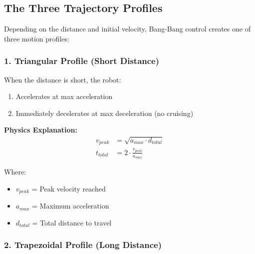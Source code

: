 \documentclass[12pt,a4paper]{article}
\begin{document}
\subsection{The Three Trajectory Profiles}

Depending on the distance and initial velocity, Bang-Bang control creates one of three motion profiles:

\subsubsection{1. Triangular Profile (Short Distance)}

When the distance is short, the robot:
\begin{enumerate}
    \item Accelerates at max acceleration
    \item Immediately decelerates at max deceleration (no cruising)
\end{enumerate}

\begin{center}
\end{center}

\textbf{Physics Explanation:}
\begin{align}
    v_{peak} &= \sqrt{a_{max} \cdot d_{total}} \\
    t_{total} &= 2 \cdot \frac{v_{peak}}{a_{max}}
\end{align}

Where:
\begin{itemize}
    \item $v_{peak}$ = Peak velocity reached
    \item $a_{max}$ = Maximum acceleration
    \item $d_{total}$ = Total distance to travel
\end{itemize}

\subsubsection{2. Trapezoidal Profile (Long Distance)}
\end{document}
